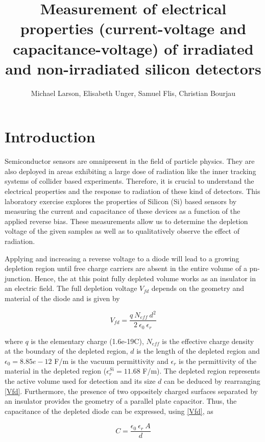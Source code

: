 \documentclass[11pt,a4paper]{report}
\title{Measurement of electrical properties (current-voltage and capacitance-voltage) of irradiated and non-irradiated silicon detectors}
\author{Michael Larson, Elisabeth Unger, Samuel Flis, Christian Bourjau}
\begin{document}
\maketitle

\section*{Introduction}
\label{sec:introduction}

Semiconductor sensors are omnipresent in the field of particle physics.
They are also deployed in areas exhibiting a large dose of radiation like the inner tracking systems of collider based experiments.
Therefore, it is crucial to understand the electrical properties and the response to radiation of these kind of detectors.
This laboratory exercise explores the  properties of Silicon (Si) based sensors by measuring the current and capacitance of these devices as a function of the applied reverse bias.
These measurements allow us to determine the depletion voltage of the given samples as well as to qualitatively observe the effect of radiation.

Applying and increasing a reverse voltage to a diode will lead to a growing depletion region until free charge carriers are absent in the entire volume of a pn-junction.
Hence, the at this point fully depleted volume works as an insulator in an electric field. The full depletion voltage $V_{fd}$ depends on the geometry and material of the diode and is given by 

\begin{equation}
  \label{Vfd}
  V_{fd} = \frac{q ~ N_{eff} ~ d^2}{2 ~ \epsilon_0 ~ \epsilon_r}
\end{equation}

where $q$ is the elementary charge (1.6e-19C), $N_{eff}$ is the effective charge density at the boundary of the depleted region, $d$ is the length of the depleted region and $\epsilon_0 = 8.85e-12$ F/m is the vacuum permittivity and $\epsilon_r$ is the permittivity of the material in the depleted region ($\epsilon_r^{Si} = 11.68$ F/m)\cite{cv_iv_manual}.
The depleted region represents the active volume used for detection and its size $d$ can be deduced by rearranging \eqref{Vfd}.
Furthermore, the presence of two oppositely charged surfaces separated by an insulator provides the geometry of a parallel plate capacitor. Thus, the capacitance of the depleted diode can be expressed, using \eqref{Vfd}, as

\begin{equation}
  \label{C}
  C = \frac{\epsilon_{0} ~ \epsilon_{r} ~ A}{d}
\end{equation}
\end{document}
